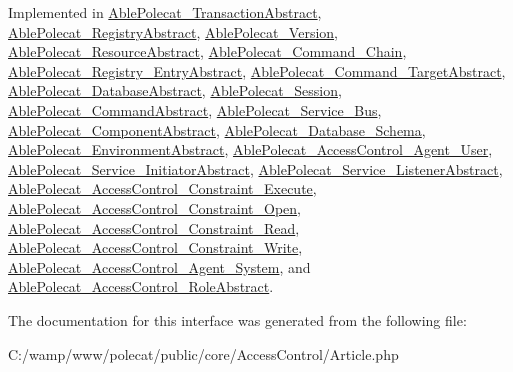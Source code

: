 Implemented in \hyperlink{class_able_polecat___transaction_abstract_ad9ade868bd136d32967059d1cccb3e92}{Able\+Polecat\+\_\+\+Transaction\+Abstract}, \hyperlink{class_able_polecat___registry_abstract_ad9ade868bd136d32967059d1cccb3e92}{Able\+Polecat\+\_\+\+Registry\+Abstract}, \hyperlink{class_able_polecat___version_ad9ade868bd136d32967059d1cccb3e92}{Able\+Polecat\+\_\+\+Version}, \hyperlink{class_able_polecat___resource_abstract_ad9ade868bd136d32967059d1cccb3e92}{Able\+Polecat\+\_\+\+Resource\+Abstract}, \hyperlink{class_able_polecat___command___chain_ad9ade868bd136d32967059d1cccb3e92}{Able\+Polecat\+\_\+\+Command\+\_\+\+Chain}, \hyperlink{class_able_polecat___registry___entry_abstract_ad9ade868bd136d32967059d1cccb3e92}{Able\+Polecat\+\_\+\+Registry\+\_\+\+Entry\+Abstract}, \hyperlink{class_able_polecat___command___target_abstract_ad9ade868bd136d32967059d1cccb3e92}{Able\+Polecat\+\_\+\+Command\+\_\+\+Target\+Abstract}, \hyperlink{class_able_polecat___database_abstract_ad9ade868bd136d32967059d1cccb3e92}{Able\+Polecat\+\_\+\+Database\+Abstract}, \hyperlink{class_able_polecat___session_ad9ade868bd136d32967059d1cccb3e92}{Able\+Polecat\+\_\+\+Session}, \hyperlink{class_able_polecat___command_abstract_ad9ade868bd136d32967059d1cccb3e92}{Able\+Polecat\+\_\+\+Command\+Abstract}, \hyperlink{class_able_polecat___service___bus_ad9ade868bd136d32967059d1cccb3e92}{Able\+Polecat\+\_\+\+Service\+\_\+\+Bus}, \hyperlink{class_able_polecat___component_abstract_ad9ade868bd136d32967059d1cccb3e92}{Able\+Polecat\+\_\+\+Component\+Abstract}, \hyperlink{class_able_polecat___database___schema_ad9ade868bd136d32967059d1cccb3e92}{Able\+Polecat\+\_\+\+Database\+\_\+\+Schema}, \hyperlink{class_able_polecat___environment_abstract_ad9ade868bd136d32967059d1cccb3e92}{Able\+Polecat\+\_\+\+Environment\+Abstract}, \hyperlink{class_able_polecat___access_control___agent___user_ad9ade868bd136d32967059d1cccb3e92}{Able\+Polecat\+\_\+\+Access\+Control\+\_\+\+Agent\+\_\+\+User}, \hyperlink{class_able_polecat___service___initiator_abstract_ad9ade868bd136d32967059d1cccb3e92}{Able\+Polecat\+\_\+\+Service\+\_\+\+Initiator\+Abstract}, \hyperlink{class_able_polecat___service___listener_abstract_ad9ade868bd136d32967059d1cccb3e92}{Able\+Polecat\+\_\+\+Service\+\_\+\+Listener\+Abstract}, \hyperlink{class_able_polecat___access_control___constraint___execute_ad9ade868bd136d32967059d1cccb3e92}{Able\+Polecat\+\_\+\+Access\+Control\+\_\+\+Constraint\+\_\+\+Execute}, \hyperlink{class_able_polecat___access_control___constraint___open_ad9ade868bd136d32967059d1cccb3e92}{Able\+Polecat\+\_\+\+Access\+Control\+\_\+\+Constraint\+\_\+\+Open}, \hyperlink{class_able_polecat___access_control___constraint___read_ad9ade868bd136d32967059d1cccb3e92}{Able\+Polecat\+\_\+\+Access\+Control\+\_\+\+Constraint\+\_\+\+Read}, \hyperlink{class_able_polecat___access_control___constraint___write_ad9ade868bd136d32967059d1cccb3e92}{Able\+Polecat\+\_\+\+Access\+Control\+\_\+\+Constraint\+\_\+\+Write}, \hyperlink{class_able_polecat___access_control___agent___system_ad9ade868bd136d32967059d1cccb3e92}{Able\+Polecat\+\_\+\+Access\+Control\+\_\+\+Agent\+\_\+\+System}, and \hyperlink{class_able_polecat___access_control___role_abstract_ad9ade868bd136d32967059d1cccb3e92}{Able\+Polecat\+\_\+\+Access\+Control\+\_\+\+Role\+Abstract}.



The documentation for this interface was generated from the following file\+:\begin{DoxyCompactItemize}
\item 
C\+:/wamp/www/polecat/public/core/\+Access\+Control/Article.\+php\end{DoxyCompactItemize}
